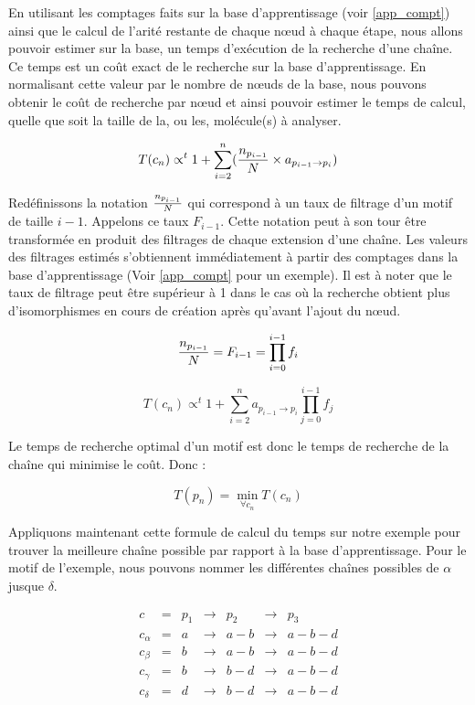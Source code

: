 En utilisant les comptages faits sur la base d'apprentissage (voir \ref{app_compt}) ainsi que le calcul de l'arité
restante de chaque n\oe{}ud à chaque étape, nous allons pouvoir estimer sur la base, un temps d'exécution de la recherche d'une
chaîne. Ce temps est un coût exact de le recherche sur la base d'apprentissage. En normalisant cette valeur par le nombre de
n\oe{}uds de la base, nous pouvons obtenir le coût de recherche par n\oe{}ud et ainsi pouvoir estimer le temps de calcul, quelle que soit la taille de la, ou les, molécule(s) à analyser.

\begin{equation}
 T(c_n) \propto^t 1 + \sum_{i=2}^n ({n_{p_{i-1}} \over N} \times a_{p_{i-1} \rightarrow p_i})
\end{equation}

Redéfinissons la notation ${n_{p_{i-1}} \over N}$ qui correspond à un taux de filtrage d'un motif de taille $i-1$.
Appelons ce taux $F_{i-1}$. Cette notation peut à son tour être transformée en
produit des filtrages de chaque extension d'une chaîne. Les valeurs des filtrages estimés s'obtiennent immédiatement à partir des
comptages dans la base d'apprentissage (Voir \ref{app_compt} pour un exemple).
Il est à noter que le taux de filtrage peut être supérieur à 1 dans le cas où la recherche obtient plus d'isomorphismes en cours de création après qu'avant l'ajout du n\oe{}ud.

\begin{equation}
 {n_{p_{i-1}} \over N} = F_{i-1} = \prod_{i=0}^{i-1} f_i
\end{equation}

\begin{equation}
 T(c_n) \propto^t 1 + \sum_{i=2}^n a_{p_{i-1} \rightarrow p_i} \prod_{j=0}^{i-1} f_j
\end{equation}

Le temps de recherche optimal d'un motif est donc le temps de recherche de la chaîne qui minimise le coût. Donc :

\begin{equation}
 T(p_n) = \min_{\forall c_n} T(c_n)
\end{equation}


Appliquons maintenant cette formule de calcul du temps sur notre exemple pour trouver la meilleure chaîne possible par
rapport à la base d'apprentissage. Pour le motif de l'exemple, nous pouvons nommer les différentes chaînes possibles de $\alpha$
jusque $\delta$.

\[
\begin{array}{ccccccc}
 c         & = & p_1 & \rightarrow & p_2     & \rightarrow & p_3 \\
 c_\alpha  & = & a   & \rightarrow & a\!-\!b & \rightarrow & a\!-\!b\!-\!d \\
 c_\beta   & = & b   & \rightarrow & a\!-\!b & \rightarrow & a\!-\!b\!-\!d \\
 c_\gamma  & = & b   & \rightarrow & b\!-\!d & \rightarrow & a\!-\!b\!-\!d \\
 c_\delta  & = & d   & \rightarrow & b\!-\!d & \rightarrow & a\!-\!b\!-\!d \\
\end{array}
\]

